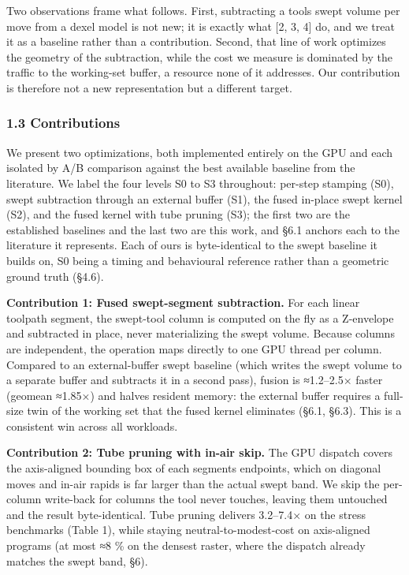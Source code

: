 \documentclass[
]{article}
\begin{document}
Two observations frame what follows. First, subtracting a
tool\textquotesingle s swept volume per move from a dexel model is not
new; it is exactly what {[}2, 3, 4{]} do, and we treat it as a baseline
rather than a contribution. Second, that line of work optimizes the
geometry of the subtraction, while the cost we measure is dominated by
the traffic to the working-set buffer, a resource none of it addresses.
Our contribution is therefore not a new representation but a different
target.

\hypertarget{contributions}{%
\subsubsection{1.3 Contributions}\label{contributions}}

We present two optimizations, both implemented entirely on the GPU and
each isolated by A/B comparison against the best available baseline from
the literature. We label the four levels S0 to S3 throughout: per-step
stamping (S0), swept subtraction through an external buffer (S1), the
fused in-place swept kernel (S2), and the fused kernel with tube pruning
(S3); the first two are the established baselines and the last two are
this work, and §6.1 anchors each to the literature it represents. Each
of ours is byte-identical to the swept baseline it builds on, S0 being a
timing and behavioural reference rather than a geometric ground truth
(§4.6).

\textbf{Contribution 1: Fused swept-segment subtraction.} For each
linear toolpath segment, the swept-tool column is computed on the fly as
a Z-envelope and subtracted in place, never materializing the swept
volume. Because columns are independent, the operation maps directly to
one GPU thread per column. Compared to an external-buffer swept baseline
(which writes the swept volume to a separate buffer and subtracts it in
a second pass), fusion is ≈1.2--2.5× faster (geomean ≈1.85×) and halves
resident memory: the external buffer requires a full-size twin of the
working set that the fused kernel eliminates (§6.1, §6.3). This is a
consistent win across all workloads.

\textbf{Contribution 2: Tube pruning with in-air skip.} The GPU dispatch
covers the axis-aligned bounding box of each segment\textquotesingle s
endpoints, which on diagonal moves and in-air rapids is far larger than
the actual swept band. We skip the per-column write-back for columns the
tool never touches, leaving them untouched and the result
byte-identical. Tube pruning delivers 3.2--7.4× on the stress benchmarks
(Table 1), while staying neutral-to-modest-cost on axis-aligned programs
(at most ≈8 \% on the densest raster, where the dispatch already matches
the swept band, §6).
\end{document}
